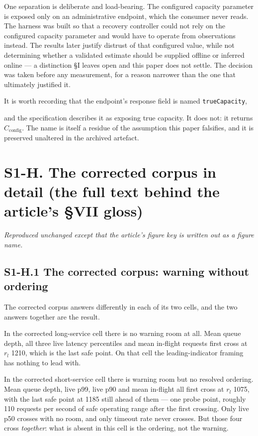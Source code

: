 \documentclass{ieeeaccess}
\begin{document}
One separation is deliberate and load-bearing. The configured capacity parameter is exposed only on an administrative endpoint, which the consumer never reads. The harness was built so that a recovery controller could not rely on the configured capacity parameter and would have to operate from observations instead. The results later justify distrust of that configured value, while not determining whether a validated estimate should be supplied offline or inferred online --- a distinction \S{}I leaves open and this paper does not settle. The decision was taken before any measurement, for a reason narrower than the one that ultimately justified it.

It is worth recording that the endpoint's response field is named \texttt{trueCapacity},

and the specification describes it as exposing true capacity. It does not: it returns $C_{\mathrm{config}}$. The name is itself a residue of the assumption this paper falsifies, and it is preserved unaltered in the archived artefact.

\section*{S1-H. The corrected corpus in detail (the full text behind the article's \S{}VII gloss)}

\textit{Reproduced unchanged except that the article's figure key is written out as a figure name.}

\subsection*{S1-H.1 The corrected corpus: warning without ordering}

The corrected corpus answers differently in each of its two cells, and the two answers together are the result.

In the corrected long-service cell there is no warning room at all. Mean queue depth, all three live latency percentiles and mean in-flight requests first cross at $r_{l}$ 1210, which is the last safe point. On that cell the leading-indicator framing has nothing to lead with.

In the corrected short-service cell there is warning room but no resolved ordering. Mean queue depth, live p99, live p90 and mean in-flight all first cross at $r_{l}$ 1075, with the last safe point at 1185 still ahead of them --- one probe point, roughly 110 requests per second of safe operating range after the first crossing. Only live p50 crosses with no room, and only timeout rate never crosses. But those four cross \textit{together}: what is absent in this cell is the ordering, not the warning.
\end{document}
